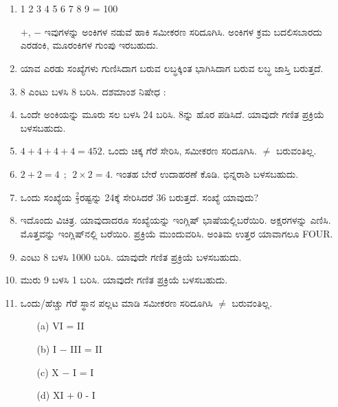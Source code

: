 \chapter[ಅಧ್ಯಾಯ 8]{}\label{chap8}

\begin{enumerate}
\renewcommand{\labelenumi}{\bf\theenumi.}
\itemsep=5pt

\item 1 2 3 4 5 6 7 8 9 = 100

$+$, $-$ ಇವುಗಳನ್ನು ಅಂಕಿಗಳ ನಡುವೆ ಹಾಕಿ ಸಮೀಕರಣ ಸರಿದೂಗಿಸಿ. ಅಂಕಿಗಳ ಕ್ರಮ ಬದಲಿಸಬಾರದು ಎರಡಂಕಿ, ಮೂರಂಕಿಗಳ ಗುಂಪು ಇರಬಹುದು. 

\item ಯಾವ ಎರಡು ಸಂಖ್ಯೆಗಳು ಗುಣಿಸಿದಾಗ ಬರುವ ಲಬ್ಧಕ್ಕಿಂತ ಭಾಗಿಸಿದಾಗ ಬರುವ ಲಬ್ಧ ಜಾಸ್ತಿ ಬರುತ್ತದೆ. 

\item 8 ಎಂಟು ಬಳಸಿ 8 ಬರಿಸಿ. ದಶಮಾಂಶ ನಿಷೇಧ :

\item ಒಂದೇ ಅಂಕಿಯನ್ನು ಮೂರು ಸಲ ಬಳಸಿ 24 ಬರಿಸಿ. 8ನ್ನು ಹೊರ ಪಡಿಸಿದೆ. ಯಾವುದೇ ಗಣಿತ ಪ್ರಕ್ರಿಯೆ ಬಳಸಬಹುದು. 

\item $4 + 4 + 4 + 4 = 452$. ಒಂದು ಚಿಕ್ಕ ಗೆರೆ ಸೇರಿಸಿ, ಸಮೀಕರಣ ಸರಿದೂಗಿಸಿ. $\neq$ ಬರುವಂತಿಲ್ಲ. 

\item $2 + 2 = 4 ~~;~~ 2\times 2 = 4$. ಇಂತಹ ಬೇರೆ ಉದಾಹರಣೆ ಕೊಡಿ. ಭಿನ್ನರಾಶಿ ಬಳಸಬಹುದು. 

\item ಒಂದು ಸಂಖ್ಯೆಯ $\frac{2}{3}$ರಷ್ಟನ್ನು 24ಕ್ಕೆ ಸೇರಿಸಿದರೆ 36 ಬರುತ್ತದೆ. ಸಂಖ್ಯೆ ಯಾವುದು? 

\item ಇದೊಂದು ವಿಚಿತ್ರ. ಯಾವುದಾದರೂ ಸಂಖ್ಯೆಯನ್ನು ಇಂಗ್ಲಿಷ್ ಭಾಷೆಯಲ್ಲಿ\break ಬರೆಯಿರಿ. ಅಕ್ಷರಗಳನ್ನು ಎಣಿಸಿ. ಮೊತ್ತವನ್ನು ಇಂಗ್ಲಿಷ್‌ನಲ್ಲಿ ಬರೆಯಿರಿ. ಪ್ರಕ್ರಿಯೆ ಮುಂದುವರಿಸಿ. ಅಂತಿಮ ಉತ್ತರ ಯಾವಾಗಲೂ FOUR.

\item ಎಂಟು 8 ಬಳಸಿ 1000 ಬರಿಸಿ. ಯಾವುದೇ ಗಣಿತ ಪ್ರಕ್ರಿಯೆ ಬಳಸಬಹುದು. 

\item ಮುರು 9 ಬಳಸಿ 1  ಬರಿಸಿ. ಯಾವುದೇ ಗಣಿತ ಪ್ರಕ್ರಿಯೆ ಬಳಸಬಹುದು. 

\eject

\item ಒಂದು/ಹೆಚ್ಚು ಗೆರೆ ಸ್ಥಾನ ಪಲ್ಲಟ ಮಾಡಿ ಸಮೀಕರಣ ಸರಿದೂಗಿಸಿ $\neq$ ಬರುವಂತಿಲ್ಲ. 
\begin{itemize}
\item[(a)] VI = II
\item[(b)] I $-$ III = II
\item[(c)] X $-$ I = I
\item[(d)] XI $+$ 0 - I
\end{itemize}


\end{enumerate}
